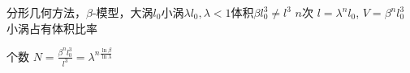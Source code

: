 \documentclass[12pt]{ctexart}
\begin{document}
分形几何方法，$\beta$-模型，大涡$l_0$小涡$\lambda l_0,\lambda<1$体积$\beta l_0^3 \neq l^3$ $n$次 $l = \lambda^{n}l_0$, $V = \beta^{n} l_0^{3}$ 小涡占有体积比率

个数 $N = \frac{\beta^{n}l_0^{3}}{l^{3}} = \lambda^{n \frac{\ln \beta}{\ln \lambda}}$



























% 
\end{document}
